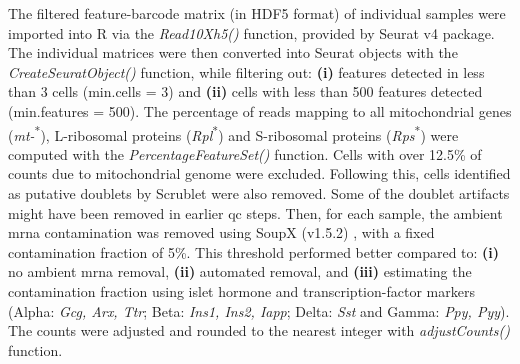 The filtered feature-barcode matrix (in HDF5 format) of individual samples were imported into R via the \textit{Read10X\textunderscore h5()} function, provided by Seurat v4 \textbf{\cite{hao_integrated_2021}} package. The individual matrices were then converted into Seurat objects with the \textit{CreateSeuratObject()} function, while filtering out: \textbf{(i)} features detected in less than 3 cells (min.cells = 3) and \textbf{(ii)} cells with less than 500 features detected (min.features = 500). The percentage of reads mapping to all mitochondrial genes (\textit{mt-}\textsuperscript{*}), L-ribosomal proteins (\textit{Rpl}\textsuperscript{*}) and S-ribosomal proteins (\textit{Rps}\textsuperscript{*}) were computed with the \textit{PercentageFeatureSet()} function. Cells with over 12.5\% of counts due to mitochondrial genome were excluded. Following this, cells identified as putative doublets by Scrublet were also removed. Some of the doublet artifacts might have been removed in earlier \gls{qc} steps. Then, for each sample, the ambient \gls{mrna} contamination was removed using SoupX (v1.5.2) \textbf{\cite{young_soupx_2020}}, with a fixed contamination fraction of 5\%. This threshold performed better compared to: \textbf{(i)} no ambient \gls{mrna} removal, \textbf{(ii)} automated removal, and \textbf{(iii)} estimating the contamination fraction using islet hormone and transcription-factor markers (Alpha: \textit{Gcg, Arx, Ttr}; Beta: \textit{Ins1, Ins2, Iapp}; Delta: \textit{Sst} and Gamma: \textit{Ppy, Pyy}). The counts were adjusted and rounded to the nearest integer with \textit{adjustCounts()} function.  


